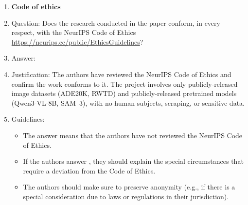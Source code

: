 \begin{enumerate}
\item {\bf Code of ethics}
    \item[] Question: Does the research conducted in the paper conform, in every respect, with the NeurIPS Code of Ethics \url{https://neurips.cc/public/EthicsGuidelines}?
    \item[] Answer: \answerYes{}
    \item[] Justification: The authors have reviewed the NeurIPS Code of Ethics and confirm the work conforms to it. The project involves only publicly-released image datasets (ADE20K, RWTD) and publicly-released pretrained models (Qwen3-VL-8B, SAM~3), with no human subjects, scraping, or sensitive data.
    \item[] Guidelines:
    \begin{itemize}
        \item The answer \answerNA{} means that the authors have not reviewed the NeurIPS Code of Ethics.
        \item If the authors answer \answerNo, they should explain the special circumstances that require a deviation from the Code of Ethics.
        \item The authors should make sure to preserve anonymity (e.g., if there is a special consideration due to laws or regulations in their jurisdiction).
    \end{itemize}



\end{enumerate}
